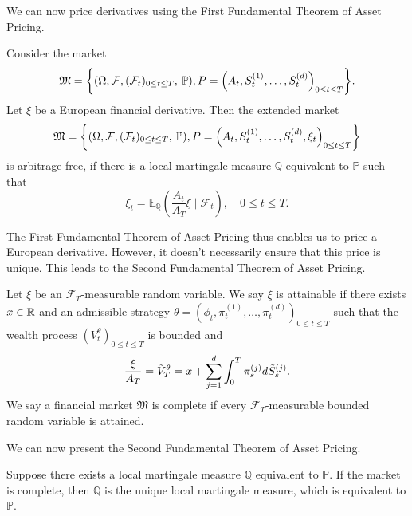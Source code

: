 We can now price derivatives using the First Fundamental Theorem of Asset Pricing.
\begin{cor}
Consider the market
\begin{equation}
    \mathfrak{M}=\left\{\left(\Omega,\mathcal{F},(\mathcal{F}_{t})_{0\leq t\leq T},\hspace{2 pt}\mathbb{P}\right), P=\left(A_{t},S_{t}^{(1)},\dots,S_{t}^{(d)}\right)_{0\leq t\leq T}\right\}.
\end{equation}
Let $\xi$ be a European financial derivative. Then the extended market
\begin{equation}
    \mathfrak{M}=\left\{\left(\Omega,\mathcal{F},(\mathcal{F}_{t})_{0\leq t\leq T},\hspace{2 pt}\mathbb{P}\right), P=\left(A_{t},S_{t}^{(1)},\dots,S_{t}^{(d)}, \xi_{t}\right)_{0\leq t\leq T}\right\}
\end{equation}
is arbitrage free, if there is a local martingale measure $\mathbb{Q}$ equivalent to $\mathbb{P}$ such that
\begin{equation}
    \xi_{t}=\mathbb{E}_{\mathbb{Q}}\left(\frac{A_t}{A_T}\xi\mid \mathcal{F}_{t}\right),\quad 0\leq t\leq T.
\end{equation}
\end{cor}
The First Fundamental Theorem of Asset Pricing thus enables us to price a European derivative. However, it doesn't necessarily ensure that this price is unique. This leads to the Second Fundamental Theorem of Asset Pricing. 
\begin{defn}
Let $\xi$ be an $\mathcal{F}_{T}$-measurable random variable. We say $\xi$ is attainable if there exists $x\in\mathbb{R}$ and an admissible strategy $\theta = (\phi_{t},\pi_{t}^{(1)},\dots, \pi_{t}^{(d)})_{0\leq t\leq T}$ such that the wealth process $(V_{t}^{\theta})_{0\leq t\leq T}$ is bounded and
\begin{equation}
    \frac{\xi}{A_{T}}=\Tilde{V}_{T}^{\theta}=x+\sum_{j=1}^{d}\int_{0}^{T}\pi_{s}^{(j)}d\Tilde{S}_{s}^{(j)}.
\end{equation}
We say a financial market $\mathfrak{M}$ is complete if every $\mathcal{F}_T$-measurable bounded random variable is attained.
\end{defn}
We can now present the Second Fundamental Theorem of Asset Pricing.
\begin{thm}
Suppose there exists a local martingale measure $\mathbb{Q}$ equivalent to $\mathbb{P}$. If the market is complete, then $\mathbb{Q}$ is the unique local martingale measure, which is equivalent to $\mathbb{P}$.
\end{thm}
